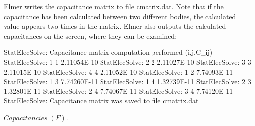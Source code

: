 \begin{flushleft}

Elmer writes the capacitance matrix to file cmatrix.dat.
Note that if the capacitance has been calculated between two different bodies, the calculated value appears two times in the matrix.
Elmer also outputs the calculated capacitances on the screen, where they can be examined:

\begin{center}
\ttbegin
StatElecSolve: Capacitance matrix computation performed (i,j,C_ij)
StatElecSolve:   1  1    2.11054E-10
StatElecSolve:   2  2    2.11027E-10
StatElecSolve:   3  3    2.11015E-10
StatElecSolve:   4  4    2.11052E-10
StatElecSolve:   1  2    7.74093E-11
StatElecSolve:   1  3    7.74260E-11
StatElecSolve:   1  4    1.32739E-11
StatElecSolve:   2  3    1.32801E-11
StatElecSolve:   2  4    7.74067E-11
StatElecSolve:   3  4    7.74120E-11
StatElecSolve: Capacitance matrix was saved to file cmatrix.dat
\ttend 

$Capacitancies$ $(F)$.
\end{center}


\end{flushleft}




























